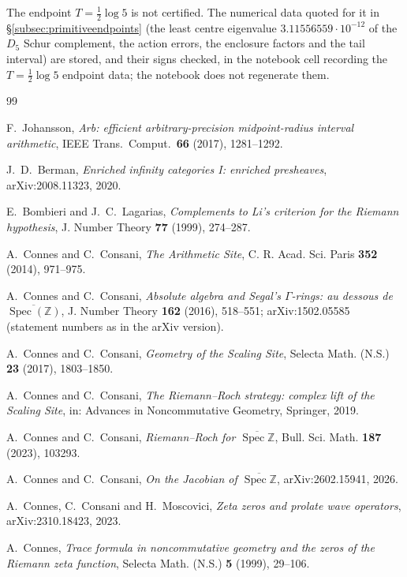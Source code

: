 \documentclass[11pt]{amsart}
\theoremstyle{definition}
\theoremstyle{remark}
\newcommand{\Z}{\mathbb Z}
\newcommand{\Spec}{\operatorname{Spec}}
\begin{document}
The endpoint \(T=\frac12\log5\) is not certified.  The numerical data
quoted for it in \S\ref{subsec:primitiveendpoints} (the least centre
eigenvalue \(3.11556559\cdot10^{-12}\) of the \(D_5\) Schur complement, the action errors, the enclosure factors and
the tail interval) are stored, and their signs checked, in the notebook cell
recording the \(T=\frac12\log5\) endpoint data; the notebook does not
regenerate them.

\begin{thebibliography}{99}

F.~Johansson, \emph{Arb: efficient arbitrary-precision midpoint-radius
interval arithmetic}, IEEE Trans.\ Comput.\ \textbf{66} (2017), 1281--1292.

J.~D.~Berman, \emph{Enriched infinity categories I: enriched presheaves},
arXiv:2008.11323, 2020.

E.~Bombieri and J.~C.~Lagarias, \emph{Complements to Li's criterion for the
Riemann hypothesis}, J. Number Theory \textbf{77} (1999), 274--287.

A.~Connes and C.~Consani, \emph{The Arithmetic Site},
C. R. Acad. Sci. Paris \textbf{352} (2014), 971--975.

A.~Connes and C.~Consani, \emph{Absolute algebra and Segal's $\Gamma$-rings: au dessous de
$\overline{\Spec(\Z)}$}, J. Number Theory \textbf{162} (2016), 518--551;
arXiv:1502.05585 (statement numbers as in the arXiv version).

A.~Connes and C.~Consani, \emph{Geometry of the Scaling Site},
Selecta Math. (N.S.) \textbf{23} (2017), 1803--1850.

A.~Connes and C.~Consani, \emph{The Riemann--Roch strategy: complex lift of
the Scaling Site}, in: Advances in Noncommutative Geometry, Springer, 2019.

A.~Connes and C.~Consani, \emph{Riemann--Roch for
$\overline{\Spec\Z}$}, Bull. Sci. Math. \textbf{187} (2023), 103293.

A.~Connes and C.~Consani, \emph{On the Jacobian of
$\overline{\Spec\Z}$}, arXiv:2602.15941, 2026.

A.~Connes, C.~Consani and H.~Moscovici, \emph{Zeta zeros and prolate wave
operators}, arXiv:2310.18423, 2023.

A.~Connes, \emph{Trace formula in noncommutative geometry and the zeros of
the Riemann zeta function}, Selecta Math. (N.S.) \textbf{5} (1999), 29--106.


\end{thebibliography}
\end{document}
